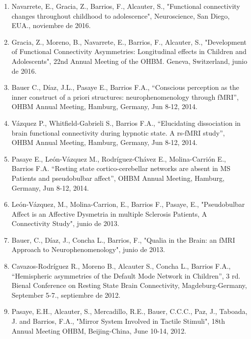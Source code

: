\begin{enumerate}
\item Navarrete, E., Gracia, Z., Barrios, F., Alcauter, S., "Functional connectivity changes throughout childhood to 
adolescence", Neuroscience, San Diego, EUA., noviembre de 2016.

\item Gracia, Z., Moreno, B., Navarrete, E., Barrios, F., Alcauter, S., "Development of Functional Connectivity Asymmetries: 
Longitudinal effects in Children and Adolescents", 22nd Annual Meeting of the OHBM. Geneva, Switzerland, junio de 2016.

\item Bauer C., Díaz, J.L., Pasaye E., Barrios F.A., “Conscious perception as the inner construct of a priori structures: 
neurophenomenology through fMRI”, OHBM Annual Meeting, Hamburg, Germany, Jun 8-12, 2014.

\item Vázquez P., Whitfield-Gabrieli S., Barrios F.A., “Elucidating dissociation in brain functional connectivity during 
hypnotic state. A rs-fMRI study”, OHBM Annual Meeting, Hamburg, Germany, Jun 8-12, 2014.

\item Pasaye E., León-Vázquez M., Rodríguez-Chávez E., Molina-Carrión E., Barrios F.A. “Resting state cortico-cerebellar networks are absent in MS 
Patients and pseudobulbar affect”, OHBM Annual Meeting, 
Hamburg, Germany, Jun 8-12, 2014.

\item León-Vázquez, M., Molina-Carrion, E., Barrios F., Pasaye, E., "Pseudobulbar Affect is an Affective Dysmetria in 
multiple Sclerosis Patients, A Connectivity Study", junio de 2013.

\item Bauer, C., Díaz, J., Concha L., Barrios, F., "Qualia in the Brain: an fMRI Approach to Neurophenomenology", junio de 2013.

\item Cavazos-Rodríguez R., Moreno B., Alcauter S., Concha L., Barrios F.A., “Hemispheric asymmetries of the Default Mode 
Network in Children”, 3 rd. Bienal Conference on Resting State Brain Connectivity, Magdeburg-Germany, September 5-7., septiembre de 2012.

\item Pasaye, E.H., Alcauter, S., Mercadillo, R.E., Bauer, C.C.C., Paz, J., Taboada, J. and Barrios, F.A., "Mirror System 
Involved in Tactile Stimuli", 18th Annual Meeting OHBM, Beijing-China, June 10-14, 2012.


\end{enumerate}
